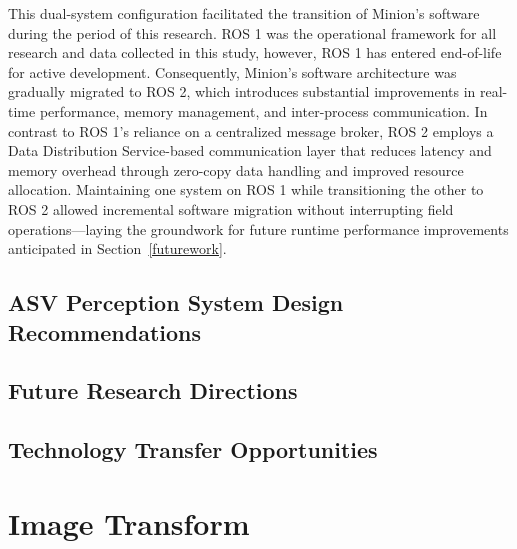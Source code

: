 \documentclass{erauthesis}
\begin{document}
This dual-system configuration facilitated the transition of Minion's software during the period of this research.
\ac{ROS} 1 was the operational framework for all research and data collected in this study, however, \ac{ROS} 1 has entered end-of-life for active development.
Consequently, Minion’s software architecture was gradually migrated to \ac{ROS} 2, which introduces substantial improvements in real-time performance, memory management, and inter-process communication.
In contrast to ROS 1’s reliance on a centralized message broker, ROS 2 employs a Data Distribution Service-based communication layer that reduces latency and memory overhead through zero-copy data handling and improved resource allocation.
Maintaining one system on ROS 1 while transitioning the other to ROS 2 allowed incremental software migration without interrupting field operations—laying the groundwork for future runtime performance improvements anticipated in Section~\ref{futurework}.


\section{ASV Perception System Design Recommendations}

\section{Future Research Directions}

\section{Technology Transfer Opportunities}




% 


\backmatter

\chapter{Image Transform} \label{img_tform}
\end{document}
